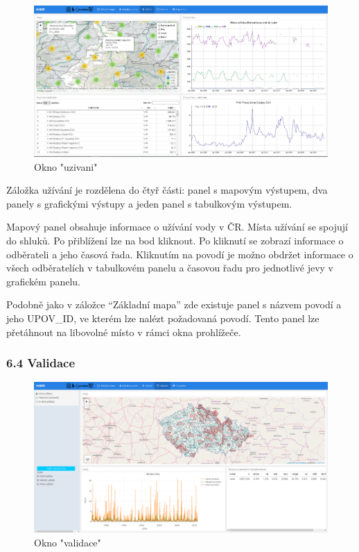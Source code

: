 \documentclass[12pt,]{article}
\begin{document}
\begin{figure}[H]
      \includegraphics[width=\textwidth]{fig/P_uzivani}
      \caption{Okno "uzivani"}
      \label{fig3}
\end{figure}

Záložka užívání je rozdělena do čtyř části: panel s mapovým výstupem,
dva panely s grafickými výstupy a jeden panel s tabulkovým výstupem.

Mapový panel obsahuje informace o užívání vody v ČR. Místa užívání se
spojují do shluků. Po přiblížení lze na bod kliknout. Po kliknutí se
zobrazí informace o odběrateli a jeho časová řada. Kliknutím na povodí
je možno obdržet informace o všech odběratelích v tabulkovém panelu a
časovou řadu pro jednotlivé jevy v grafickém panelu.

Podobně jako v záložce \enquote{Základní mapa} zde existuje panel s
názvem povodí a jeho UPOV\_ID, ve kterém lze nalézt požadovaná povodí.
Tento panel lze přetáhnout na libovolné místo v rámci okna prohlížeče.

\subsubsection{6.4 Validace}\label{validace}

\begin{figure}[H]
      \includegraphics[width=\textwidth]{fig/P_validace}
      \caption{Okno "validace"}
      \label{fig4}
\end{figure}
\end{document}
